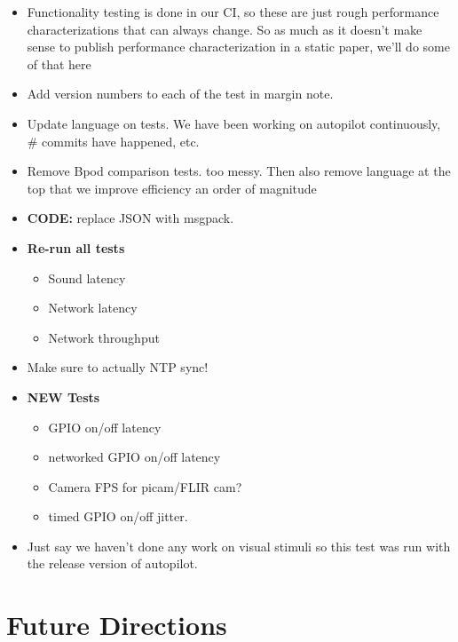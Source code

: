\begin{itemize}
\item Functionality testing is done in our CI, so these are just rough performance characterizations that can always change. So as much as it doesn't make sense to publish performance characterization in a static paper, we'll do some of that here
\item Add version numbers to each of the test in margin note.
\item Update language on tests. We have been working on autopilot continuously, \# commits have happened, etc.
\item Remove Bpod comparison tests. too messy. Then also remove language at the top that we improve efficiency an order of magnitude
\item \textbf{CODE:} replace JSON with msgpack.
\item \textbf{Re-run all tests} 
\begin{itemize}
\item Sound latency
\item Network latency
\item Network throughput
\end{itemize}
\item Make sure to actually NTP sync!
\item \textbf{NEW Tests}
\begin{itemize}
\item GPIO on/off latency
\item networked GPIO on/off latency
\item Camera FPS for picam/FLIR cam?
\item timed GPIO on/off jitter.
\end{itemize}
\item Just say we haven't done any work on visual stimuli so this test was run with the release version of autopilot.

\end{itemize}

\section{Future Directions}

